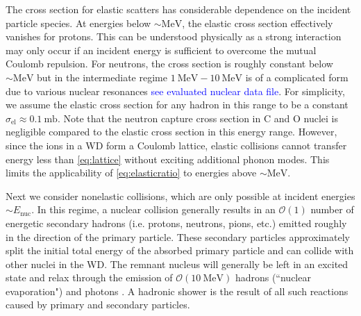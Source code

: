 \documentclass[twocolumn,showpacs,preprintnumbers,amsmath,amssymb,prd]{revtex4}
\newcommand{\OO}{\mathcal{O}}
\begin{document}
\begin{appendices}
The cross section for elastic scatters has considerable dependence on the incident particle species. At energies below $\sim \text{MeV}$, the elastic cross section effectively vanishes for  protons. This can be understood physically as a strong interaction may only occur if an incident energy is sufficient to overcome the mutual Coulomb repulsion. For neutrons, the cross section is roughly constant below $\sim \text{MeV}$ but in the intermediate regime $1 ~\text{MeV} - \text{10} ~\text{MeV}$ is of a complicated form due to various nuclear resonances \textcolor{blue}{see evaluated nuclear data file}. For simplicity, we assume the elastic cross section for any hadron in this range to be a constant $\sigma_\text{el} \approx 0.1 ~\text{mb}$. Note that the neutron capture cross section in C and O nuclei is negligible compared to the elastic cross section in this energy range. However, since the ions in a WD form a Coulomb lattice, elastic collisions cannot transfer energy less than \eqref{eq:lattice} without exciting additional phonon modes. This limits the applicability of \eqref{eq:elasticratio} to energies above $\sim \text{MeV}$.

Next we consider nonelastic collisions, which are only possible at incident energies $\sim E_\text{nuc}$. In this regime, a nuclear collision generally results in an $\OO(1)$ number of energetic secondary hadrons (i.e. protons, neutrons, pions, etc.) emitted roughly in the direction of the primary particle. These secondary particles approximately split the initial total energy of the absorbed primary particle and can collide with other nuclei in the WD. The remnant nucleus will generally be left in an excited state and relax through the emission of $\OO(10 ~\text{MeV})$ hadrons (``nuclear evaporation") and photons \cite{Rossi}. A hadronic shower is the result of all such reactions caused by primary and secondary particles.


\end{appendices}
\end{document}
